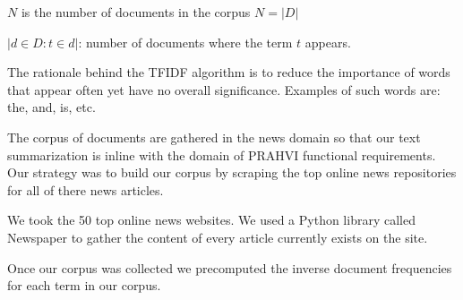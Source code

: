 	\forceindent $N$ is the number of documents in the corpus $N = |D|$

	\forceindent ${|d \in D : t \in d|}$: number of documents where the term $t$ appears.

The rationale behind the TFIDF algorithm is to reduce the importance of words that appear often yet have no overall significance. Examples of such words are: the, and, is, etc.


The corpus of documents are gathered in the news domain so that our text summarization is inline with the domain of PRAHVI functional requirements. Our strategy was to build our corpus by scraping the top online news repositories for all of there news articles. 

We took the 50 top online news websites. We used a Python library called Newspaper to gather the content of every article currently exists on the site.

Once our corpus was collected we precomputed the inverse document frequencies for each term in our corpus.
